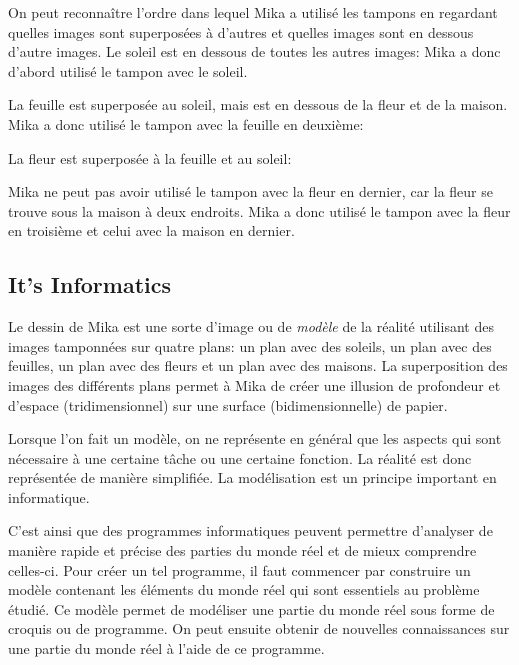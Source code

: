 \documentclass[a4paper,11pt]{report}
\newcommand{\taskGraphicsFolder}{..}
\begin{document}
On peut reconnaître l’ordre dans lequel Mika a utilisé les tampons en regardant quelles images sont superposées à d’autres et quelles images sont en dessous d’autre images. Le soleil est en dessous de toutes les autres images: Mika a donc d’abord utilisé le tampon avec le soleil.

{\centering%
\par}

La feuille est superposée au soleil, mais est en dessous de la fleur et de la maison. Mika a donc utilisé le tampon avec la feuille en deuxième:

{\centering%
\par}

La fleur est superposée à la feuille et au soleil:

{\centering%
\par}

Mika ne peut pas avoir utilisé le tampon avec la fleur en dernier, car la fleur se trouve sous la maison à deux endroits. Mika a donc utilisé le tampon avec la fleur en troisième et celui avec la maison en dernier.

{\centering%
\par}


\subsection*{It’s Informatics}

Le dessin de Mika est une sorte d’image ou de \emph{modèle} de la réalité utilisant des images tamponnées sur quatre plans: un plan avec des soleils, un plan avec des feuilles, un plan avec des fleurs et un plan avec des maisons. La superposition des images des différents plans permet à Mika de créer une illusion de profondeur et d’espace (tridimensionnel) sur une surface (bidimensionnelle) de papier.

Lorsque l’on fait un modèle, on ne représente en général que les aspects qui sont nécessaire à une certaine tâche ou une certaine fonction. La réalité est donc représentée de manière simplifiée. La modélisation est un principe important en informatique.

C’est ainsi que des programmes informatiques peuvent permettre d’analyser de manière rapide et précise des parties du monde réel et de mieux comprendre celles-ci. Pour créer un tel programme, il faut commencer par construire un modèle contenant les éléments du monde réel qui sont essentiels au problème étudié. Ce modèle permet de modéliser une partie du monde réel sous forme de croquis ou de programme. On peut ensuite obtenir de nouvelles connaissances sur une partie du monde réel à l’aide de ce programme.
\end{document}
